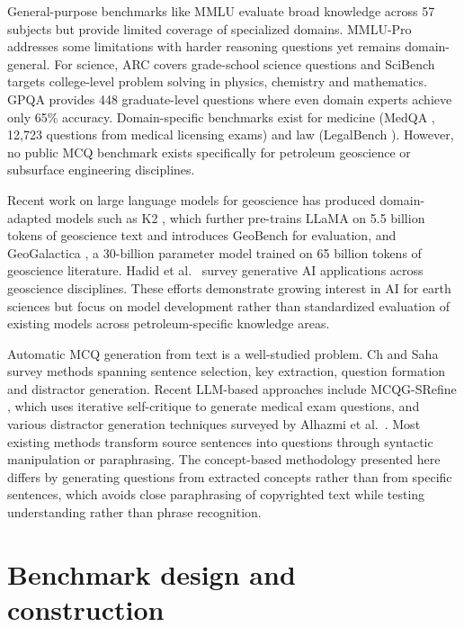 \documentclass[11pt]{article}
\begin{document}
General-purpose benchmarks like MMLU \cite{mmlu} evaluate broad knowledge across 57 subjects but provide limited coverage of specialized domains. MMLU-Pro \cite{mmlu_pro} addresses some limitations with harder reasoning questions yet remains domain-general. For science, ARC \cite{arc} covers grade-school science questions and SciBench \cite{scibench} targets college-level problem solving in physics, chemistry and mathematics. GPQA \cite{gpqa} provides 448 graduate-level questions where even domain experts achieve only 65\% accuracy. Domain-specific benchmarks exist for medicine (MedQA \cite{medqa}, 12,723 questions from medical licensing exams) and law (LegalBench \cite{legalbench}). However, no public MCQ benchmark exists specifically for petroleum geoscience or subsurface engineering disciplines.

Recent work on large language models for geoscience has produced domain-adapted models such as K2 \cite{k2_geoscience}, which further pre-trains LLaMA on 5.5 billion tokens of geoscience text and introduces GeoBench for evaluation, and GeoGalactica \cite{geogalactica}, a 30-billion parameter model trained on 65 billion tokens of geoscience literature. Hadid et al.\ \cite{hadid_genai_geoscience} survey generative AI applications across geoscience disciplines. These efforts demonstrate growing interest in AI for earth sciences but focus on model development rather than standardized evaluation of existing models across petroleum-specific knowledge areas.

Automatic MCQ generation from text is a well-studied problem. Ch and Saha \cite{mcq_survey} survey methods spanning sentence selection, key extraction, question formation and distractor generation. Recent LLM-based approaches include MCQG-SRefine \cite{mcqg_srefine}, which uses iterative self-critique to generate medical exam questions, and various distractor generation techniques surveyed by Alhazmi et al.\ \cite{distractor_survey}. Most existing methods transform source sentences into questions through syntactic manipulation or paraphrasing. The concept-based methodology presented here differs by generating questions from extracted concepts rather than from specific sentences, which avoids close paraphrasing of copyrighted text while testing understanding rather than phrase recognition.

\section{Benchmark design and construction}
\end{document}
